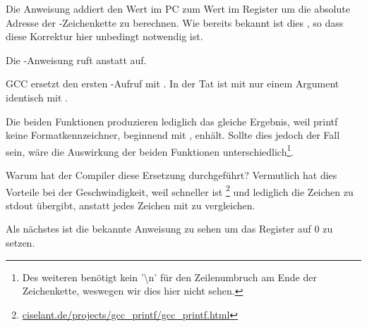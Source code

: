 
Die Anweisung  addiert den Wert im \ac{PC} zum Wert im Register 
um die absolute Adresse der -Zeichenkette zu berechnen.
Wie bereits bekannt ist dies \q{\PICcode}, so dass diese Korrektur hier unbedingt notwendig ist.

Die -Anweisung ruft \puts anstatt \printf auf.

\label{puts}

GCC ersetzt den ersten \printf-Aufruf mit \puts. In der Tat ist \printf mit nur einem
Argument identisch mit \puts.

Die beiden Funktionen produzieren lediglich das gleiche Ergebnis, weil printf keine
Formatkennzeichner, beginnend mit \IT{\%}, enhält.
Sollte dies jedoch der Fall sein, wäre die Auswirkung der beiden Funktionen
unterschiedlich\footnote{Des weiteren benötigt \puts kein '\textbackslash{}n'
für den Zeilenumbruch am Ende der Zeichenkette, weswegen wir dies hier nicht sehen.}.

Warum hat der Compiler diese Ersetzung durchgeführt? Vermutlich hat dies Vorteile bei
der Geschwindigkeit, weil \puts schneller ist
\footnote{\href{http://go.yurichev.com/17063}{ciselant.de/projects/gcc\_printf/gcc\_printf.html}}
und lediglich die Zeichen zu \gls{stdout} übergibt, anstatt jedes Zeichen mit \IT{\%} zu vergleichen.

Als nächstes ist die bekannte Anweisung  zu sehen um das Register  auf 0 zu setzen.
